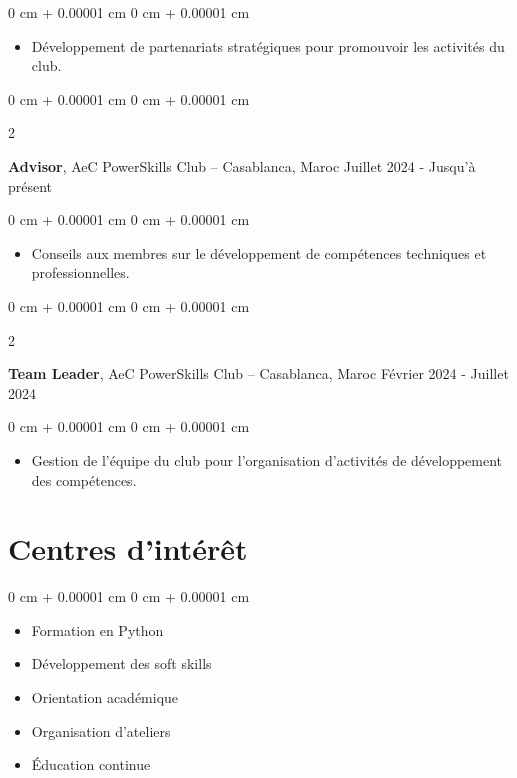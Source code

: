 \documentclass[10pt, letterpaper]{article}
\newenvironment{highlights}{
    \begin{itemize}[
        topsep=0.10 cm,
        parsep=0.10 cm,
        partopsep=0pt,
        itemsep=0pt,
        leftmargin=0 cm + 10pt
    ]
}{
    \end{itemize}
} %
\newenvironment{highlightsforbulletentries}{
    \begin{itemize}[
        topsep=0.10 cm,
        parsep=0.10 cm,
        partopsep=0pt,
        itemsep=0pt,
        leftmargin=10pt
    ]
}{
    \end{itemize}
} %
\newenvironment{onecolentry}{
    \begin{adjustwidth}{
        0 cm + 0.00001 cm
    }{
        0 cm + 0.00001 cm
    }
}{
    \end{adjustwidth}
} %
\newenvironment{twocolentry}[2][]{
    \onecolentry
    \def\secondColumn{#2}
    \setcolumnwidth{\fill, 5 cm}
    \begin{paracol}{2}
}{
    \switchcolumn \raggedleft \secondColumn
    \end{paracol}
    \endonecolentry
} %
\begin{document}
		\vspace{0.10 cm}
		\begin{onecolentry}
			\begin{highlights}
				\item Développement de partenariats stratégiques pour promouvoir les activités du club.
			\end{highlights}
		\end{onecolentry}
		
		
		\vspace{0.5 cm}
		
		\begin{twocolentry}{
				Juillet 2024 - Jusqu'à présent
			}
			\textbf{Advisor}, AeC PowerSkills Club -- Casablanca, Maroc\end{twocolentry}
		
		\vspace{0.10 cm}
		\begin{onecolentry}
			\begin{highlights}
				\item Conseils aux membres sur le développement de compétences techniques et professionnelles.
			\end{highlights}
		\end{onecolentry}
		
		
		\vspace{0.5 cm}
		
		\begin{twocolentry}{
				Février 2024 - Juillet 2024
			}
			\textbf{Team Leader}, AeC PowerSkills Club -- Casablanca, Maroc\end{twocolentry}
		
		\vspace{0.10 cm}
		\begin{onecolentry}
			\begin{highlights}
				\item Gestion de l'équipe du club pour l'organisation d'activités de développement des compétences.
			\end{highlights}
		\end{onecolentry}



    \section{Centres d'intérêt}

	\begin{onecolentry}
		\begin{highlightsforbulletentries}
			\item Formation en Python
			\item Développement des soft skills
			\item Orientation académique
			\item Organisation d'ateliers
			\item Éducation continue
		\end{highlightsforbulletentries}
	\end{onecolentry}
\end{document}
